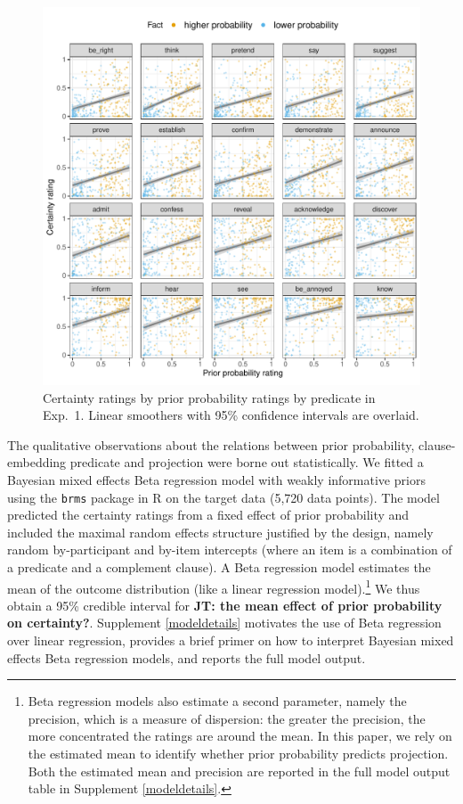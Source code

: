 \documentclass[11pt,fleqn]{article}
\newcommand{\6}{\mbox{$[\hspace*{-.6mm}[$}}
\newcommand{\9}{\mbox{$]\hspace*{-.6mm}]$}}
\newcommand{\jt}[1]{\textbf{\color{blue}JT: #1}}
\begin{document}
\begin{figure}[h!]
\centering

\includegraphics[width=.7\paperwidth]{../../results/exp4/graphs/projection-by-prior}

\caption{Certainty ratings by prior probability ratings by predicate in Exp.~1. Linear smoothers with 95\% confidence intervals are overlaid.}
\label{f-projection}
\end{figure}

\newpage

The qualitative observations about the relations between prior probability, clause-embedding predicate and projection were borne out statistically. We fitted a Bayesian mixed effects Beta regression model  with weakly informative priors using the \verb|brms| \citep{buerkner2017}  package in R \citep{R} on the target data (5,720 data points). The model predicted the certainty ratings from a fixed effect of prior probability and included the maximal random effects structure justified by the design, namely random by-participant and by-item intercepts (where an item is a combination of a predicate and a complement clause). A Beta regression model estimates the mean of the outcome distribution (like a linear regression model).\footnote{Beta regression models also estimate a second parameter, namely the precision, which is a measure of dispersion: the greater the precision, the more concentrated the ratings are around the mean. In this paper, we rely on the estimated mean to identify whether prior probability predicts projection. Both the estimated mean and precision are reported in the full model output table in Supplement \ref{modeldetails}.} We thus obtain a 95\% credible interval for \jt{the mean effect of prior probability on certainty?}. Supplement \ref{modeldetails} motivates the use of Beta regression over linear regression, provides a brief primer on how to interpret Bayesian mixed effects Beta regression models, and reports the full model output.
\end{document}
